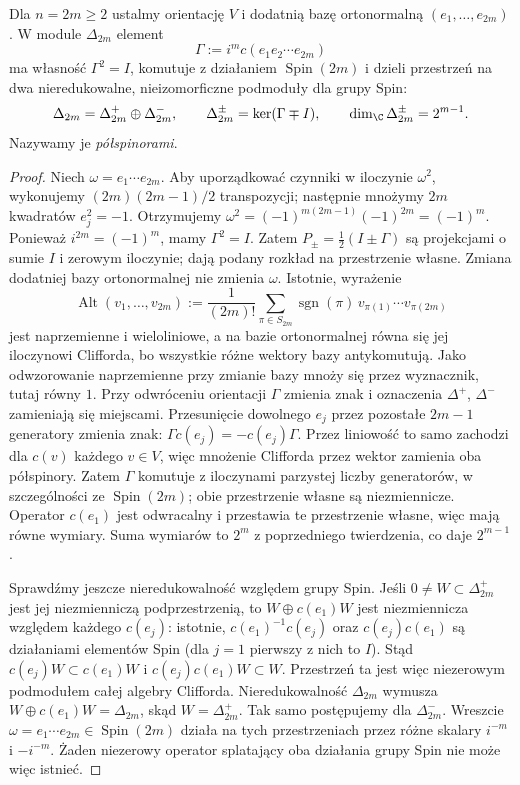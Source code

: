 \begin{stwierdzenie}
\label{prop:spin-chiral}
Dla $n=2m\geq2$ ustalmy orientację $V$ i dodatnią bazę
ortonormalną $(e_1,\ldots,e_{2m})$. W module $\Delta_{2m}$
element
\[
 \Gamma:=i^m c(e_1e_2\cdots e_{2m})
\]
ma własność $\Gamma^2=I$, komutuje z działaniem
$\operatorname{Spin}(2m)$ i dzieli przestrzeń
na dwa nieredukowalne, nieizomorficzne podmoduły dla grupy Spin:
\[
 \Delta_{2m}=\Delta^+_{2m}\oplus\Delta^-_{2m},
 \qquad
 \Delta^\pm_{2m}=\ker(\Gamma\mp I),\qquad
 \dim_\C\Delta^\pm_{2m}=2^{m-1}.
\]
Nazywamy je \emph{półspinorami}.
\end{stwierdzenie}
\begin{proof}
Niech $\omega=e_1\cdots e_{2m}$. Aby uporządkować czynniki
w iloczynie $\omega^2$, wykonujemy $(2m)(2m-1)/2$ transpozycji;
następnie mnożymy $2m$ kwadratów $e_j^2=-1$.
Otrzymujemy
$\omega^2=(-1)^{m(2m-1)}(-1)^{2m}=(-1)^m$.
Ponieważ $i^{2m}=(-1)^m$, mamy $\Gamma^2=I$.
Zatem $P_\pm=\tfrac12(I\pm\Gamma)$ są projekcjami
o sumie $I$ i zerowym iloczynie; dają podany rozkład na przestrzenie własne.
Zmiana dodatniej bazy ortonormalnej nie zmienia $\omega$.
Istotnie, wyrażenie
\[
 \operatorname{Alt}(v_1,\ldots,v_{2m})
 :=\frac{1}{(2m)!}
   \sum_{\pi\in S_{2m}}\operatorname{sgn}(\pi)\,
    v_{\pi(1)}\cdots v_{\pi(2m)}
\]
jest naprzemienne i wieloliniowe, a na bazie ortonormalnej
równa się jej iloczynowi Clifforda, bo wszystkie różne
wektory bazy antykomutują. Jako odwzorowanie naprzemienne
przy zmianie bazy mnoży się przez wyznacznik, tutaj równy $1$.
Przy odwróceniu orientacji $\Gamma$ zmienia znak i oznaczenia
$\Delta^+$, $\Delta^-$ zamieniają się miejscami.
Przesunięcie dowolnego $e_j$ przez pozostałe
$2m-1$ generatory zmienia znak:
$\Gamma c(e_j)=-c(e_j)\Gamma$.
Przez liniowość to samo zachodzi dla $c(v)$ każdego $v\in V$,
więc mnożenie Clifforda przez wektor zamienia oba półspinory.
Zatem $\Gamma$ komutuje z iloczynami
parzystej liczby generatorów, w szczególności
ze $\operatorname{Spin}(2m)$; obie przestrzenie
własne są niezmiennicze. Operator
$c(e_1)$ jest odwracalny i przestawia
te przestrzenie własne, więc mają równe
wymiary. Suma wymiarów to $2^m$ z poprzedniego
twierdzenia, co daje $2^{m-1}$.

Sprawdźmy jeszcze nieredukowalność względem grupy Spin.
Jeśli $0\ne W\subset\Delta^+_{2m}$ jest jej niezmienniczą
podprzestrzenią, to $W\oplus c(e_1)W$ jest niezmiennicza
względem każdego $c(e_j)$: istotnie,
$c(e_1)^{-1}c(e_j)$ oraz $c(e_j)c(e_1)$ są działaniami
elementów Spin (dla $j=1$ pierwszy z nich to $I$).
Stąd $c(e_j)W\subset c(e_1)W$ i
$c(e_j)c(e_1)W\subset W$.
Przestrzeń ta jest więc niezerowym podmodułem całej algebry
Clifforda. Nieredukowalność $\Delta_{2m}$ wymusza
$W\oplus c(e_1)W=\Delta_{2m}$, skąd $W=\Delta^+_{2m}$.
Tak samo postępujemy dla $\Delta^-_{2m}$.
Wreszcie $\omega=e_1\cdots e_{2m}\in\operatorname{Spin}(2m)$
działa na tych przestrzeniach przez różne skalary
$i^{-m}$ i $-i^{-m}$. Żaden niezerowy operator splatający
oba działania grupy Spin nie może więc istnieć.
\end{proof}

